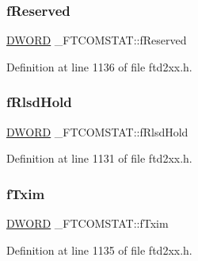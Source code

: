 \subsubsection{\texorpdfstring{f\+Reserved}{fReserved}}
{\footnotesize\ttfamily \hyperlink{CatCaloProto40MHz_2inc_2WinTypes_8h_ad342ac907eb044443153a22f964bf0af}{D\+W\+O\+RD} \+\_\+\+F\+T\+C\+O\+M\+S\+T\+A\+T\+::f\+Reserved}



Definition at line 1136 of file ftd2xx.\+h.

\mbox{\label{struct__FTCOMSTAT_afb2b9a88896f528efbe6c9ff73b7744c}} 
\subsubsection{\texorpdfstring{f\+Rlsd\+Hold}{fRlsdHold}}
{\footnotesize\ttfamily \hyperlink{CatCaloProto40MHz_2inc_2WinTypes_8h_ad342ac907eb044443153a22f964bf0af}{D\+W\+O\+RD} \+\_\+\+F\+T\+C\+O\+M\+S\+T\+A\+T\+::f\+Rlsd\+Hold}



Definition at line 1131 of file ftd2xx.\+h.

\mbox{\label{struct__FTCOMSTAT_a04853d07abaf4fb47891a3bbdd78be8d}} 
\subsubsection{\texorpdfstring{f\+Txim}{fTxim}}
{\footnotesize\ttfamily \hyperlink{CatCaloProto40MHz_2inc_2WinTypes_8h_ad342ac907eb044443153a22f964bf0af}{D\+W\+O\+RD} \+\_\+\+F\+T\+C\+O\+M\+S\+T\+A\+T\+::f\+Txim}



Definition at line 1135 of file ftd2xx.\+h.

\mbox{\label{struct__FTCOMSTAT_a5b2fd786cc95e60df49aa55f7d4d7d5a}} 
